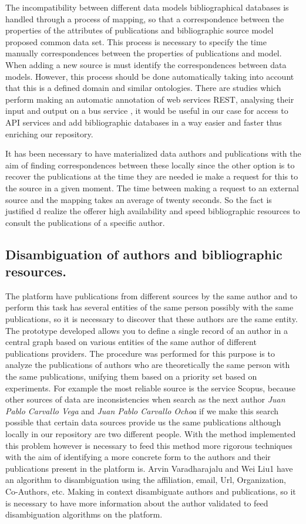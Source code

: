 \documentclass[11pt]{article}
\begin{document}
The incompatibility between different data models bibliographical databases is handled through a process of mapping, so that a correspondence between the properties of the attributes of publications and bibliographic source model proposed common data set. This process is necessary to specify the time manually correspondences between the properties of publications and model. When adding a new source is must identify the correspondences between data models. However, this process should be done automatically taking into account that this is a defined domain and similar ontologies.
There are studies which perform making an automatic annotation of web services REST, analysing their input and output  on a bus service \cite{Ortiz}, it would be useful in our case for access to API services and add bibliographic databases in a way easier and faster thus enriching our repository.

It has been necessary to have materialized data authors and publications with the aim of finding correspondences between these locally since the other option is to recover the publications at the time they are needed ie make a request for this to the source in a given moment. The time between making a request to an external source and the mapping takes an average of twenty seconds. So the fact is justified d realize the offerer high availability and speed bibliographic resources to consult the publications of a specific author.

\subsection{Disambiguation of authors and bibliographic resources.}

The platform have publications from different sources by the same author and to perform this task has several entities of the same person possibly with the same publications, so it is necessary to discover that these authors are the same entity. The prototype developed allows you to define a single record of an author in a central graph based on various entities of the same author of different publications providers. The procedure was performed for this purpose is to analyze the publications of authors who are theoretically the same person with the same publications, unifying them based on a priority set based on experiments. For example the most reliable source is the service Scopus, because other sources of data are inconsistencies when search as the next author   \textit{Juan Pablo Carvallo Vega} and \textit{Juan Pablo Carvallo Ochoa} if we make this search possible that certain data sources provide us the same publications although locally in our repository are two different people. With the method implemented this problem however is necessary to feed this method more rigorous techniques with the aim of identifying a more concrete form to the authors and their publications present in the platform is. Arvin Varadharajalu and Wei Liu1 \cite{varadharajalu2011author} have an algorithm to disambiguation using the affiliation, email, Url, Organization, Co-Authors, etc. Making in context disambiguate authors and publications, so it is necessary to have more information about the author validated to feed disambiguation algorithms on the platform.
\end{document}
